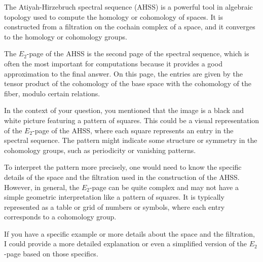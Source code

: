 The Atiyah-Hirzebruch spectral sequence (AHSS) is a powerful tool in algebraic topology used to compute the homology or cohomology of spaces. It is constructed from a filtration on the cochain complex of a space, and it converges to the homology or cohomology groups.

The \( E_2 \)-page of the AHSS is the second page of the spectral sequence, which is often the most important for computations because it provides a good approximation to the final answer. On this page, the entries are given by the tensor product of the cohomology of the base space with the cohomology of the fiber, modulo certain relations.

In the context of your question, you mentioned that the image is a black and white picture featuring a pattern of squares. This could be a visual representation of the \( E_2 \)-page of the AHSS, where each square represents an entry in the spectral sequence. The pattern might indicate some structure or symmetry in the cohomology groups, such as periodicity or vanishing patterns.

To interpret the pattern more precisely, one would need to know the specific details of the space and the filtration used in the construction of the AHSS. However, in general, the \( E_2 \)-page can be quite complex and may not have a simple geometric interpretation like a pattern of squares. It is typically represented as a table or grid of numbers or symbols, where each entry corresponds to a cohomology group.

If you have a specific example or more details about the space and the filtration, I could provide a more detailed explanation or even a simplified version of the \( E_2 \)-page based on those specifics.